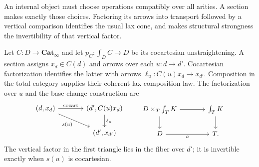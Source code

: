 \documentclass[oneside]{article}
\theoremstyle{plain}
\theoremstyle{definition}
\theoremstyle{remark}
\newcommand{\Cat}{\mathbf{Cat}_{\infty}}
\begin{document}
An internal object must choose operations compatibly over all arities.
A section makes exactly those choices. Factoring its arrows into
transport followed by a vertical comparison identifies the usual lax
cone, and makes structural strongness the invertibility of that vertical
factor.

Let $C:D\to\Cat$ and let $p_C:\int_D C\to D$ be its cocartesian
unstraightening. A section assigns $x_d\in C(d)$ and arrows over each
$u:d\to d'$. Cocartesian factorization identifies the latter with arrows
$\ell_u:C(u)x_d\to x_{d'}$. Composition in the total category supplies
their coherent lax composition law.
The factorization over $u$ and the base-change construction are
\[
\begin{tikzcd}[column sep=large]
 (d,x_d)\ar[r,"\mathrm{cocart}"]\ar[dr,"s(u)"']&
 (d',C(u)x_d)\ar[d,"\ell_u"]\\
 &(d',x_{d'})
\end{tikzcd}
\qquad
\begin{tikzcd}[column sep=large]
 D\times_T\int_TK\ar[r]\ar[d]&\int_TK\ar[d]\\
 D\ar[r,"a"']&T.
\end{tikzcd}
\]
The vertical factor in the first triangle lies in the fiber over $d'$;
it is invertible exactly when $s(u)$ is cocartesian.
\end{document}
